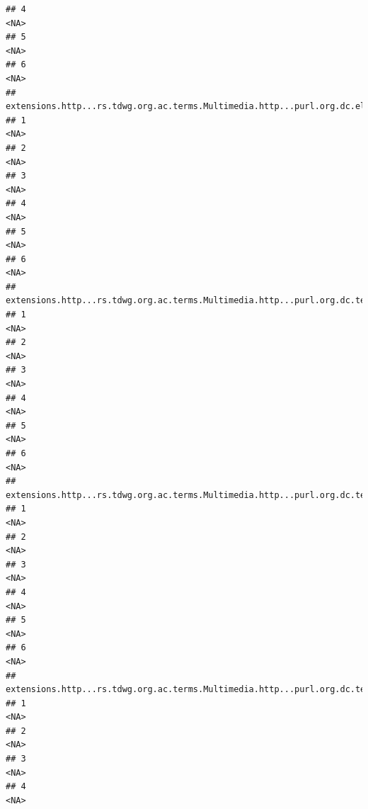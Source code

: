 \documentclass[
]{book}
\begin{document}
\begin{verbatim}
## 4                                                                                      <NA>
## 5                                                                                      <NA>
## 6                                                                                      <NA>
##   extensions.http...rs.tdwg.org.ac.terms.Multimedia.http...purl.org.dc.elements.1.1.source.2
## 1                                                                                       <NA>
## 2                                                                                       <NA>
## 3                                                                                       <NA>
## 4                                                                                       <NA>
## 5                                                                                       <NA>
## 6                                                                                       <NA>
##   extensions.http...rs.tdwg.org.ac.terms.Multimedia.http...purl.org.dc.terms.rights.2
## 1                                                                                <NA>
## 2                                                                                <NA>
## 3                                                                                <NA>
## 4                                                                                <NA>
## 5                                                                                <NA>
## 6                                                                                <NA>
##   extensions.http...rs.tdwg.org.ac.terms.Multimedia.http...purl.org.dc.terms.source.2
## 1                                                                                <NA>
## 2                                                                                <NA>
## 3                                                                                <NA>
## 4                                                                                <NA>
## 5                                                                                <NA>
## 6                                                                                <NA>
##   extensions.http...rs.tdwg.org.ac.terms.Multimedia.http...purl.org.dc.terms.type.2
## 1                                                                              <NA>
## 2                                                                              <NA>
## 3                                                                              <NA>
## 4                                                                              <NA>

\end{verbatim}
\end{document}
